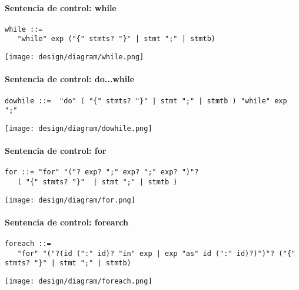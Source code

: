 \paragraph{Sentencia de control: while}
\begin{multicols}{2}
\begin{lstlisting}[style=nonumbers,
    basicstyle=\tiny]
while ::= 
   "while" exp ("{" stmts? "}" | stmt ";" | stmtb)
\end{lstlisting}  	
\columnbreak
\begin{center}
\texttt{[image: design/diagram/while.png]} 
\end{center}
\end{multicols}

\paragraph{Sentencia de control: do...while}
\begin{lstlisting}[style=nonumbers]
dowhile ::=  "do" ( "{" stmts? "}" | stmt ";" | stmtb ) "while" exp ";"
\end{lstlisting}  	
\begin{center}
\texttt{[image: design/diagram/dowhile.png]} 
\end{center}

\paragraph{Sentencia de control: for}
\begin{lstlisting}[style=nonumbers]
for ::= "for" "("? exp? ";" exp? ";" exp? ")"? 
   ( "{" stmts? "}"  | stmt ";" | stmtb )
\end{lstlisting}  	
\begin{center}
\texttt{[image: design/diagram/for.png]} 
\end{center}
\paragraph{Sentencia de control: forearch}
\begin{lstlisting}[style=nonumbers,basicstyle=\tiny]
foreach ::= 
   "for" "("?(id (":" id)? "in" exp | exp "as" id (":" id)?)")"? ("{" stmts? "}" | stmt ";" | stmtb)
\end{lstlisting}  	
\begin{center}
\texttt{[image: design/diagram/foreach.png]} 
\end{center}
\pagebreak
